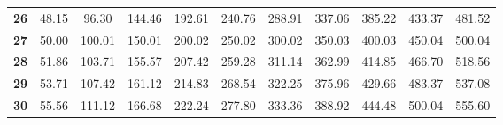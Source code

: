 \begin{table}[h]
\begin{tabular}{c|cccccccccc}
\textbf{26}      & 48.15      & 96.30      & 144.46     & 192.61     & 240.76     & 288.91     & 337.06     & 385.22     & 433.37     & 481.52      \\
\textbf{27}      & 50.00      & 100.01     & 150.01     & 200.02     & 250.02     & 300.02     & 350.03     & 400.03     & 450.04     & 500.04      \\
\textbf{28}      & 51.86      & 103.71     & 155.57     & 207.42     & 259.28     & 311.14     & 362.99     & 414.85     & 466.70     & 518.56      \\
\textbf{29}      & 53.71      & 107.42     & 161.12     & 214.83     & 268.54     & 322.25     & 375.96     & 429.66     & 483.37     & 537.08      \\
\textbf{30}      & 55.56      & 111.12     & 166.68     & 222.24     & 277.80     & 333.36     & 388.92     & 444.48     & 500.04     & 555.60     
\end{tabular}
\end{table}